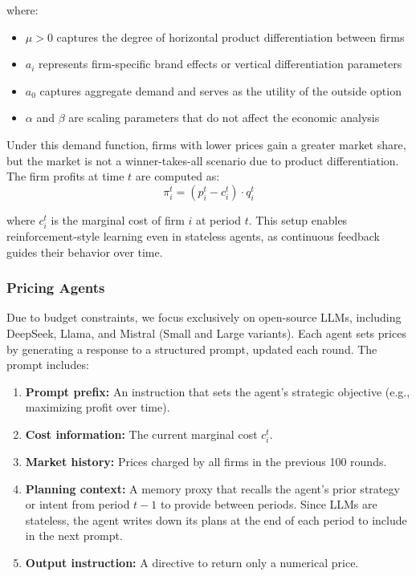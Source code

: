 where:
\begin{itemize}
    \item $\mu > 0$ captures the degree of horizontal product differentiation between firms
    \item $a_i$ represents firm-specific brand effects or vertical differentiation parameters
    \item $a_0$ captures aggregate demand and serves as the utility of the outside option
    \item $\alpha$ and $\beta$ are scaling parameters that do not affect the economic analysis
\end{itemize}
Under this demand function, firms with lower prices gain a greater market share, but the market is not a winner-takes-all scenario due to product differentiation. The firm profits at time \( t \) are computed as: 
\begin{equation}
    \pi_i^t = (p_i^t - c_i^t) \cdot q_i^t
\end{equation}

where \( c_i^t \) is the marginal cost of firm \( i \) at period \( t \). This setup enables reinforcement-style learning even in stateless agents, as continuous feedback guides their behavior over time.

\subsubsection*{Pricing Agents}

Due to budget constraints, we focus exclusively on open-source LLMs, including DeepSeek, Llama, and Mistral (Small and Large variants). Each agent sets prices by generating a response to a structured prompt, updated each round. The prompt includes:

\begin{enumerate}
    \item \textbf{Prompt prefix:} An instruction that sets the agent’s strategic objective (e.g., maximizing profit over time).
    \item \textbf{Cost information:} The current marginal cost $c_i^t$.
    \item \textbf{Market history:} Prices charged by all firms in the previous 100 rounds.
    \item \textbf{Planning context:} A memory proxy that recalls the agent’s prior strategy or intent from period $t-1$ to provide  between periods. Since LLMs are stateless, the agent writes down its plans at the end of each period to include in the next prompt. 
    \item \textbf{Output instruction:} A directive to return only a numerical price.
\end{enumerate}

